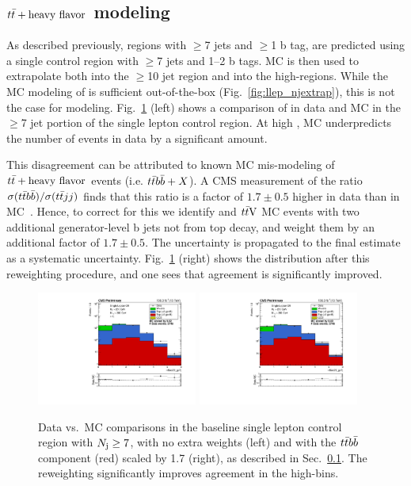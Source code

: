 \subsection{$t\bar{t}+\text{heavy flavor}$ modeling}
\label{sec:llep_ttbb}
As described previously, regions with $\geq$7 jets and $\geq$1 b tag, are predicted
using a single control region with $\geq$7 jets and 1--2 b tags. MC is then used to
extrapolate both into the $\geq$10 jet region and into the high-\Nb regions.
While the MC modeling of \Nj is sufficient out-of-the-box (Fig.~\ref{fig:llep_njextrap}),
this is not the case for \Nb modeling. Fig.~\ref{fig:llep_nbextrap} (left) shows a comparison
of \Nb in data and MC in the $\geq$7 jet portion of the single lepton control region.
At high \Nb, MC underpredicts the number of events in data by a significant amount.

This disagreement can be attributed to known MC mis-modeling of $t\bar{t}+\text{heavy flavor}$
events (i.e. $t\bar{t} b\bar{b}+X$). A CMS measurement of the ratio 
$\sigma(t\bar{t} b\bar{b})/\sigma(t\bar{t} jj)$ finds that this ratio is a factor of $1.7\pm0.5$ higher
in data than in MC~\cite{TOP_ttbb}. Hence, to correct for this we identify \ttbar and $t\bar{t}\mathrm{V}$ MC
events with two additional generator-level b jets not from top decay, and weight them by an additional
factor of $1.7\pm0.5$. The uncertainty is propagated to the final estimate as a systematic uncertainty.
Fig.~\ref{fig:llep_nbextrap} (right) shows the \Nb distribution after this reweighting procedure, and
one sees that agreement is significantly improved.

\begin{figure}[ht]
  \begin{center}
    \includegraphics[width=0.47\textwidth]{figs/llep/crslbase_nBJet20_ge7j_ttbbNonWeighted.pdf}
    \includegraphics[width=0.47\textwidth]{figs/llep/crslbase_nBJet20_ge7j_ttbbWeighted.pdf}
    \caption{Data vs.\ MC \Nb comparisons in the baseline single lepton control region with $N_{\mathrm{j}}\geq7$,
      with no extra weights (left) and with the $t\bar{t} b\bar{b}$ component (red) scaled by 1.7 (right), as described
      in Sec.~\ref{sec:llep_ttbb}. The reweighting significantly improves agreement in the high-\Nb bins.
            }
    \label{fig:llep_nbextrap}
  \end{center}
\end{figure}

